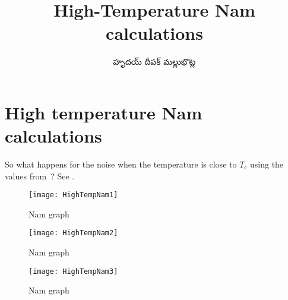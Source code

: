 \documentclass[../main.tex]{subfiles}
\title{High-Temperature Nam calculations}
\author{\begin{telugu}హృదయ్ దీపక్ మల్లుభొట్ల\end{telugu}}
\date{}
\begin{document}
	\graphicspath{{\main/figures/}}

	\onlyinsubfile{\maketitle}

	\section{High temperature Nam calculations} \label{sec:htn:intro}

	So what happens for the noise when the temperature is close to $T_c$ using the values from~\cite{Nam1967}?
	See .

	\begin{figure}[htp]
		\centering
		\texttt{[image: HighTempNam1]}
		\caption{Nam graph} \label{fig:htn:1}
	\end{figure}

	\begin{figure}[htp]
		\centering
		\texttt{[image: HighTempNam2]}
		\caption{Nam graph} \label{fig:htn:2}
	\end{figure}

	\begin{figure}[htp]
		\centering
		\texttt{[image: HighTempNam3]}
		\caption{Nam graph} \label{fig:htn:3}
	\end{figure}
\end{document}
